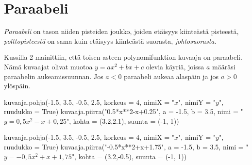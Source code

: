 \section{Paraabeli}


\emph{Paraabeli} on tason niiden pisteiden joukko, joiden etäisyys kiinteästä pisteestä, \emph{polttopisteestä} on sama kuin etäisyys kiinteästä suorasta, \emph{johtosuorasta}.

Kussilla 2 mainittiin, että toisen asteen polynomifunktion kuvaaja on paraabeli. Nämä kuvaajat olivat muotoa $y=ax^2+bx+c$ olevia käyriä, joissa $a$ määräsi paraabelin aukeamissuunnan. Jos $a<0$ paraabeli aukeaa alaspäin ja jos $a>0$ ylöspäin.

\begin{kuva}
    kuvaaja.pohja(-1.5, 3.5, -0.5, 2.5, korkeus = 4, nimiX = "$x$", nimiY = "$y$", ruudukko = True)
    kuvaaja.piirra("0.5*x**2-x+0.25", a = -1.5, b = 3.5, nimi = "$y= 0,5x^2-x+0,25$", kohta = (3.2,2.1), suunta = (-1, 1))
\end{kuva}

\begin{kuva}
    kuvaaja.pohja(-1.5, 3.5, -0.5, 2.5, korkeus = 4, nimiX = "$x$", nimiY = "$y$", ruudukko = True)
    kuvaaja.piirra("-0.5*x**2+x+1.75", a = -1.5, b = 3.5, nimi = "$y= -0,5x^2+x+1,75$", kohta = (3.2,-0.5), suunta = (-1, 1))
\end{kuva}

